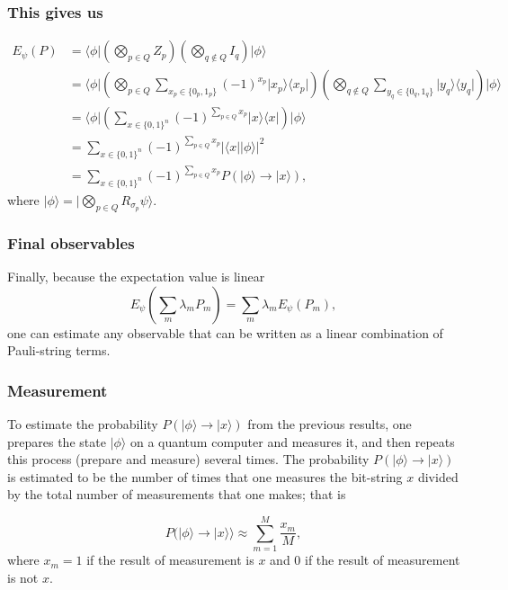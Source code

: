 \documentclass{beamer}
\begin{document}
\begin{frame}
\frametitle{This gives us}

\begin{align*}
E_{\psi}\left(P\right)
&=
\langle \phi\vert
\left(\bigotimes_{p \in Q}Z_p\right)
\left(\bigotimes_{q\notin Q}I_q\right)
\vert \phi\rangle \nonumber \\
&=
\langle \phi\vert
\left(\bigotimes_{p\in Q}\sum_{x_p\in\{0_p,1_p\}}(-1)^{x_p}\vert x_p\rangle\langle x_p\vert\right)
\left(\bigotimes_{q\notin Q}\sum_{y_q\in\{0_q,1_q\}}\vert y_q\rangle\langle y_q\vert\right)
\vert \phi\rangle 
\nonumber 
\\
&=
\langle \phi\vert
\left(\sum_{x\in\{0,1\}^n}(-1)^{\sum_{p\in Q}x_p}\vert x\rangle\langle x\vert\right)
\vert \phi\rangle 
\nonumber 
\\
&=
\sum_{x\in\{0,1\}^n}(-1)^{\sum_{p\in Q}x_p}\vert\langle x\vert\vert \phi\rangle\vert^2
\nonumber 
\\
&=
\sum_{x\in\{0,1\}^n}(-1)^{\sum_{p\in Q}x_p}P(\vert \phi\rangle\to\vert x\rangle),
\end{align*}
where $\vert \phi\rangle=\vert \bigotimes_{p\in Q}R_{\sigma_p}\psi\rangle$.
\end{frame}

\begin{frame}
\frametitle{Final observables}

Finally, because the expectation value is
linear
\[
E_\psi\left(\sum_{m}\lambda_mP_m\right) = \sum_m\lambda_mE_\psi(P_m),
\]
one can estimate any observable that can be written as a linear combination of Pauli-string terms.
\end{frame}

\begin{frame}
\frametitle{Measurement}

To estimate the probability $P(\vert \phi\rangle\to \vert x\rangle)$ from the
previous results, one prepares the state $\vert \phi\rangle$ on a quantum
computer and measures it, and then repeats this process (prepare and
measure) several times. The probability $P(\vert \phi\rangle\to \vert x\rangle)$ is
estimated to be the number of times that one measures the bit-string
$x$ divided by the total number of measurements that one makes; that
is

\[
P(\vert \phi\rangle\to \vert x\rangle\rangle \approx \sum_{m=1}^M\frac{x_m}{M},
\]
where $x_m=1$
if the result of measurement is $x$ and  $0$ if the result of measurement is not $x$.
\end{frame}
\end{document}
